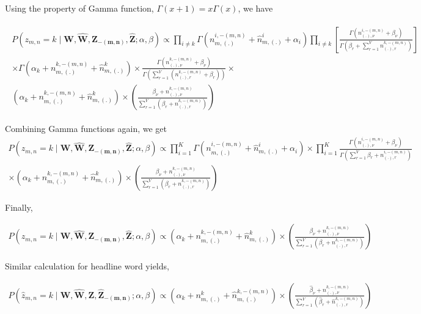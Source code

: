 \documentclass[a4paper]{article}
\begin{document}
 Using the property of Gamma function, $\Gamma(x+1) = x\Gamma(x)$, we have
 
 \begin{align*}
 \begin{split}
 P(z_{m,n} = k \mid \mathbf{W}, \mathbf{\hat{W}}, \mathbf{Z_{-(m,n)}}, \mathbf{\hat{Z}} ; \alpha, \beta ) 
 \propto 
 \prod_{i \neq k} \Gamma(n_{m,(.)}^{i,-(m,n)} + \hat{n}_{m,(.)}^{i} + \alpha_{i}  ) \prod_{i \neq k} \left[ \frac{\Gamma(n_{(.),\nu}^{i,-(m,n)} + \beta_{\nu})} {\Gamma(\beta_{r} + \sum_{r=1}^{V} n_{(.),r}^{k, -(m,n)} )} \right] \\
 \times \Gamma(\alpha_{k} + n_{m,(.)}^{k,-(m,n)}  + \hat{n}_{m,(.)}^{k}) \times \frac{\Gamma(n_{(.),\nu}^{k, -(m,n)} + \beta_{\nu})}{\Gamma(\sum_{r=1}^{V} (n_{(.),r}^{k,-(m,n)} + \beta_{r} ))} \times \\
 \left( \alpha_{k} + n_{m,(.)}^{k,-(m,n)} + \hat{n}_{m,(.)}^{k} \right) \times \left( \frac{\beta_{\nu} + n_{(.),\nu}^{k,-(m,n)}}{\sum_{r=1}^{V}(\beta_{r} + n_{(.),r}^{k,-(m,n)})} \right)
 \end{split}
 \end{align*}
 
 Combining Gamma functions again, we get
 \begin{align*}
 P(z_{m,n} = k \mid \mathbf{W}, \mathbf{\hat{W}}, \mathbf{Z_{-(m,n)}}, \mathbf{\hat{Z}} ; \alpha, \beta ) 
 \propto  \prod_{i=1}^{K} \Gamma(n_{m,(.)}^{i,-(m,n)} + \hat{n}_{m,(.)}^{i} + \alpha_{i} ) \times \prod_{i=1}^{K} \frac{\Gamma(n_{(.),\nu}^{i,-(m,n)} + \beta_{\nu} )}{\Gamma(\sum_{r=1}^{V} \beta_{r} + n_{(.),r}^{i,-(m,n)})} \\ 
  \times \left( \alpha_{k} + n_{m,(.)}^{k,-(m,n)} + \hat{n}_{m,(.)}^{k} \right) \times \left( \frac{\beta_{\nu} + n_{(.),\nu}^{k,-(m,n)}}{\sum_{r=1}^{V}(\beta_{r} + n_{(.),r}^{k,-(m,n)})} \right)
  \end{align*}
  
  Finally,
  \begin{mdframed}
  \begin{align}
   P(z_{m,n} = k \mid \mathbf{W}, \mathbf{\hat{W}}, \mathbf{Z_{-(m,n)}}, \mathbf{\hat{Z}} ; \alpha, \beta ) 
 \propto  
 \left( \alpha_{k} + n_{m,(.)}^{k,-(m,n)} + \hat{n}_{m,(.)}^{k} \right) \times \left( \frac{\beta_{\nu} + n_{(.),\nu}^{k,-(m,n)}}{\sum_{r=1}^{V}(\beta_{r} + n_{(.),r}^{k,-(m,n)})} \right)
  \end{align}
  \end{mdframed}
  
  Similar calculation for headline word yields,
 \begin{mdframed}
  \begin{align}
   P(\hat{z}_{m,n} = k \mid \mathbf{W}, \mathbf{\hat{W}}, \mathbf{Z}, \mathbf{\hat{Z}_{-(m,n)}} ; \alpha, \beta ) 
 \propto 
 \left( \alpha_{k} + n_{m,(.)}^{k} + \hat{n}_{m,(.)}^{k,-(m,n)} \right) \times \left( \frac{\hat{\beta}_{\nu} + \hat{n}_{(.),\nu}^{k,-(m,n)}}{\sum_{r=1}^{V}(\hat{\beta}_{r} + \hat{n}_{(.),r}^{k,-(m,n)})} \right)
  \end{align}
 \end{mdframed}
    
\end{document}
